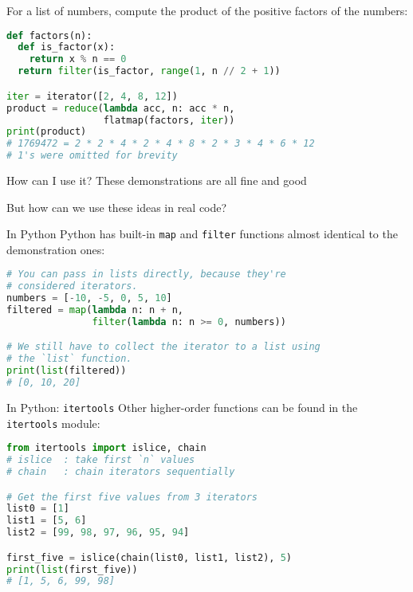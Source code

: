 \documentclass[../index.tex]{subfiles}
\begin{document}
\begin{frame}[fragile]{\currenttitle}
For a list of numbers, compute the product of the positive factors of the
numbers: \\[1em]

  \begin{lstlisting}[language=Python]
def factors(n):
  def is_factor(x):
    return x % n == 0
  return filter(is_factor, range(1, n // 2 + 1))

iter = iterator([2, 4, 8, 12])
product = reduce(lambda acc, n: acc * n,
                 flatmap(factors, iter))
print(product)
# 1769472 = 2 * 2 * 4 * 2 * 4 * 8 * 2 * 3 * 4 * 6 * 12
# 1's were omitted for brevity

  \end{lstlisting}
\end{frame}

\renewcommand{\currenttitle}{How can I use it?}
\begin{frame}[fragile]{\currenttitle}
  These demonstrations are all fine and good

  But how can we use these ideas in real code?
\end{frame}

\renewcommand{\currenttitle}{In Python}
\begin{frame}[fragile]{\currenttitle}
  Python has built-in \texttt{map} and \texttt{filter} functions almost
  identical to the demonstration ones:

  \begin{lstlisting}[language=Python]
# You can pass in lists directly, because they're
# considered iterators.
numbers = [-10, -5, 0, 5, 10]
filtered = map(lambda n: n + n,
               filter(lambda n: n >= 0, numbers))

# We still have to collect the iterator to a list using
# the `list` function.
print(list(filtered))
# [0, 10, 20]
  \end{lstlisting}
\end{frame}

\renewcommand{\currenttitle}{In Python: \texttt{itertools}}
\begin{frame}[fragile]{\currenttitle}
  Other higher-order functions can be found in the \texttt{itertools} module:

  \begin{lstlisting}[language=Python]
from itertools import islice, chain
# islice  : take first `n` values
# chain   : chain iterators sequentially

# Get the first five values from 3 iterators
list0 = [1]
list1 = [5, 6]
list2 = [99, 98, 97, 96, 95, 94]

first_five = islice(chain(list0, list1, list2), 5)
print(list(first_five))
# [1, 5, 6, 99, 98]
  \end{lstlisting}
\end{frame}
\end{document}
